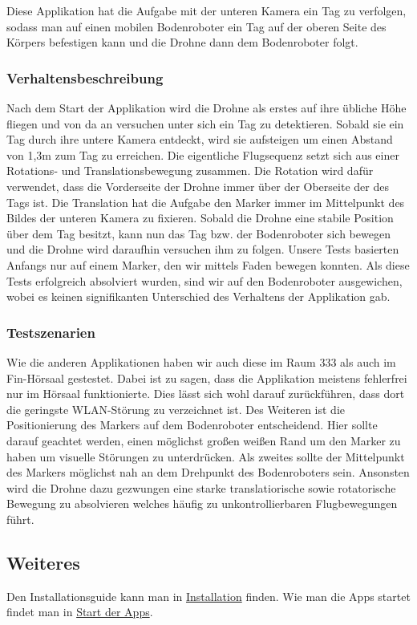 Diese Applikation hat die Aufgabe mit der unteren Kamera ein Tag zu verfolgen, sodass man auf einen mobilen Bodenroboter ein Tag auf der oberen Seite des Körpers befestigen kann und die Drohne dann dem Bodenroboter folgt.

\subsubsection*{Verhaltensbeschreibung }

Nach dem Start der Applikation wird die Drohne als erstes auf ihre übliche Höhe fliegen und von da an versuchen unter sich ein Tag zu detektieren. Sobald sie ein Tag durch ihre untere Kamera entdeckt, wird sie aufsteigen um einen Abstand von 1,3m zum Tag zu erreichen. Die eigentliche Flugsequenz setzt sich aus einer Rotations-\/ und Translationsbewegung zusammen. Die Rotation wird dafür verwendet, dass die Vorderseite der Drohne immer über der Oberseite der des Tags ist. Die Translation hat die Aufgabe den Marker immer im Mittelpunkt des Bildes der unteren Kamera zu fixieren. Sobald die Drohne eine stabile Position über dem Tag besitzt, kann nun das Tag bzw. der Bodenroboter sich bewegen und die Drohne wird daraufhin versuchen ihm zu folgen. Unsere Tests basierten Anfangs nur auf einem Marker, den wir mittels Faden bewegen konnten. Als diese Tests erfolgreich absolviert wurden, sind wir auf den Bodenroboter ausgewichen, wobei es keinen signifikanten Unterschied des Verhaltens der Applikation gab.

\subsubsection*{Testszenarien}

Wie die anderen Applikationen haben wir auch diese im Raum 333 als auch im Fin-\/Hörsaal gestestet. Dabei ist zu sagen, dass die Applikation meistens fehlerfrei nur im Hörsaal funktionierte. Dies lässt sich wohl darauf zurückführen, dass dort die geringste WLAN-\/Störung zu verzeichnet ist. Des Weiteren ist die Positionierung des Markers auf dem Bodenroboter entscheidend. Hier sollte darauf geachtet werden, einen möglichst großen weißen Rand um den Marker zu haben um visuelle Störungen zu unterdrücken. Als zweites sollte der Mittelpunkt des Markers möglichst nah an dem Drehpunkt des Bodenroboters sein. Ansonsten wird die Drohne dazu gezwungen eine starke translatiorische sowie rotatorische Bewegung zu absolvieren welches häufig zu unkontrollierbaren Flugbewegungen führt.

\subsection*{Weiteres }

Den Installationsguide kann man in \hyperlink{page1}{Installation} finden. Wie man die Apps startet findet man in \hyperlink{page2}{Start der Apps}. 